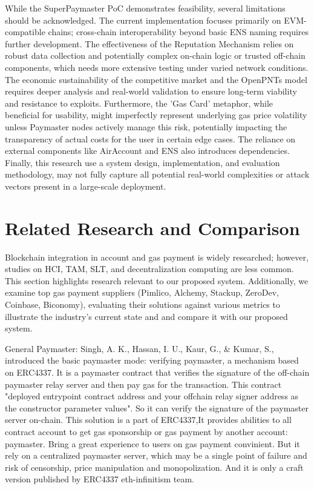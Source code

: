 \documentclass[preprint,12pt]{elsarticle}
\begin{document}
While the SuperPaymaster PoC demonstrates feasibility, several limitations should be acknowledged. The current implementation focuses primarily on EVM-compatible chains; cross-chain interoperability beyond basic ENS naming requires further development. The effectiveness of the Reputation Mechanism relies on robust data collection and potentially complex on-chain logic or trusted off-chain components, which needs more extensive testing under varied network conditions. The economic sustainability of the competitive market and the OpenPNTs model requires deeper analysis and real-world validation to ensure long-term viability and resistance to exploits. Furthermore, the 'Gas Card' metaphor, while beneficial for usability, might imperfectly represent underlying gas price volatility unless Paymaster nodes actively manage this risk, potentially impacting the transparency of actual costs for the user in certain edge cases. The reliance on external components like AirAccount and ENS also introduces dependencies. Finally, this research use a system design, implementation, and evaluation methodology, may not fully capture all potential real-world complexities or attack vectors present in a large-scale deployment.

\section{Related Research and Comparison}
\label{sec:related-work}

Blockchain integration in account and gas payment is widely researched; however, studies on HCI, TAM, SLT, and decentralization computing are less common. This section highlights research relevant to our proposed system. Additionally, we examine top gas payment suppliers (Pimlico, Alchemy, Stackup, ZeroDev, Coinbase, Biconomy), evaluating their solutions against various metrics to illustrate the industry's current state and and compare it with our proposed system.

General Paymaster: Singh, A. K., Hassan, I. U., Kaur, G., \& Kumar, S., introduced the basic paymaster mode: verifying paymaster, a mechanism based on ERC4337. It is a paymaster contract that verifies the signature of the off-chain paymaster relay server and then pay gas for the transaction. This contract "deployed entrypoint contract address and your offchain relay signer address as the constructor parameter values". So it can verify the signature of the paymaster server on-chain. This solution is a part of ERC4337,It provides abilities to all contract account to get gas sponsorship or gas payment by another account: paymaster. Bring a great experience to users on gas payment convinient. But it rely on a centralized paymaster server, which may be a single point of failure and risk of censorship, price manipulation and monopolization. And it is only a craft version published by ERC4337 eth-infinitism team.
\end{document}
